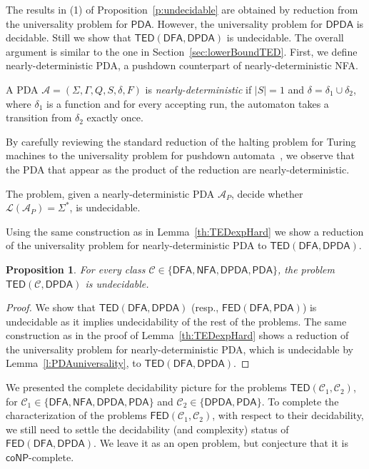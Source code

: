 \documentclass{CSML}
\newcommand{\aut}{\mathcal{A}}
\newcommand{\coNP}{\textsf{coNP}}
\newcommand{\class}{\mathcal{C}}
\newcommand{\DFA}{\mathsf{DFA}}
\newcommand{\NFA}{\mathsf{NFA}}
\newcommand{\PDA}{\mathsf{PDA}}
\newcommand{\DPDA}{\mathsf{DPDA}}
\newcommand{\TED}{\mathsf{TED}}
\newcommand{\FED}{\mathsf{FED}}
\newcommand{\lang}{\mathcal{L}}
\newtheorem{proposition}[theorem]{Proposition}
\begin{document}
The results in (1) of Proposition~\ref{p:undecidable} are obtained by reduction from
the universality problem for $\PDA$. However, the universality problem for $\DPDA$ is 
decidable. Still we show that $\TED(\DFA,\DPDA)$ is undecidable.
The overall argument is similar to the one in Section~\ref{sec:lowerBoundTED}.
First, we define nearly-deterministic PDA, a pushdown counterpart of nearly-deterministic NFA.

\begin{defi}
A PDA $\aut = (\Sigma, \Gamma, Q, S, \delta, F)$ is \emph{nearly-deterministic} if 
$|S| = 1$ and $\delta = \delta_1 \cup \delta_2$, where $\delta_1$ is a function and for
every accepting run, the automaton takes a transition from $\delta_2$ exactly once.
\end{defi}

By carefully reviewing the standard reduction of the halting problem for Turing machines to 
the universality problem for pushdown automata~\cite{HU79}, we observe that
the PDA that appear as the product of the reduction are 
nearly-deterministic.

\begin{lem}
The problem, given a nearly-deterministic PDA $\aut_P$, decide
whether $\lang({\aut_P}) = \Sigma^*$, is undecidable.
\label{l:PDAuniversality}
\end{lem}


Using the same construction as in Lemma~\ref{th:TEDexpHard} we show
a reduction of the universality problem for nearly-deterministic PDA to
$\TED(\DFA, \DPDA)$.

\begin{proposition}
For every class $\class \in \{ \DFA, \NFA, \DPDA, \PDA \}$,
the problem $\TED(\class, \DPDA)$ is undecidable.
\label{th:fromDPDAUndecidable}
\end{proposition}
\begin{proof} 
We show that $\TED(\DFA, \DPDA)$ (resp., $\FED(\DFA, \PDA)$) is undecidable as it implies undecidability of the rest of the problems.
The same construction 
as in the proof of Lemma~\ref{th:TEDexpHard} shows a reduction of 
the universality problem for nearly-deterministic PDA, which is undecidable by Lemma~\ref{l:PDAuniversality}, to $\TED(\DFA, \DPDA)$.
\end{proof}


We presented the complete decidability picture for the problems $\TED(\class_1, \class_2)$, for
 $\class_1 \in \{ \DFA, \NFA, \DPDA, \PDA \}$ and $\class_2 \in \{\DPDA, \PDA\}$. 
To complete the characterization of the problems $\FED(\class_1, \class_2)$,
with respect to their decidability, we still need to settle the decidability (and complexity)
status of $\FED(\DFA,\DPDA)$. We leave it as an open problem, but conjecture that it is $\coNP$-complete. 
\end{document}
